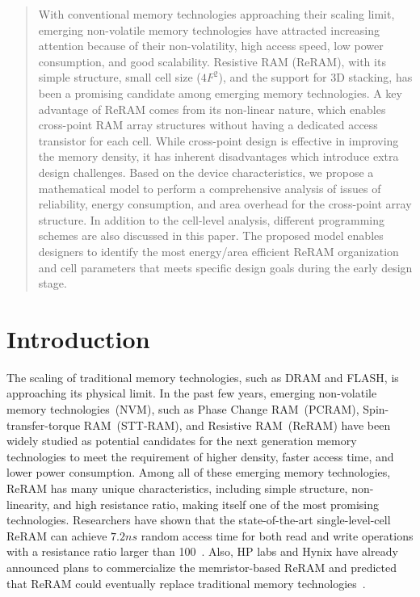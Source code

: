 \begin{abstract}
With conventional memory technologies approaching their scaling limit,
emerging non-volatile memory technologies have attracted increasing%
attention because of their non-volatility, high access speed, low power
consumption, and good scalability. Resistive RAM (ReRAM), with its simple
structure, small cell size ($4F^2$), and the support for 3D stacking, has been
a promising candidate among emerging memory technologies. 
A key advantage of ReRAM
comes from its non-linear nature, which enables  cross-point
RAM array structures without having a dedicated access transistor for each cell. While
cross-point design is effective in improving the memory density, it has
inherent disadvantages which introduce extra design challenges. Based on
the device characteristics, we propose a
mathematical model to perform a comprehensive analysis of issues of
reliability, energy consumption, and area overhead for the cross-point array structure. In addition to the
cell-level analysis, different programming schemes are also discussed in
this paper. The proposed model enables designers to identify the most
energy/area efficient ReRAM organization and cell parameters that meets
specific design goals during the early design stage.
\end{abstract}

\section{Introduction}\label{sec:intro}
The scaling of traditional memory technologies, such as DRAM and FLASH, is
approaching its physical limit. In the past few years, emerging
non-volatile memory technologies~(NVM), such as Phase Change RAM~(PCRAM),
Spin-transfer-torque RAM~(STT-RAM), and Resistive RAM~(ReRAM) have been widely
studied as potential candidates for the next generation memory
technologies to meet the requirement of higher density, faster access time, and
lower power consumption. Among all of these emerging memory technologies,
ReRAM has many unique characteristics, including simple structure,
non-linearity,  and high resistance ratio, making itself one of the most
promising technologies. Researchers have shown that the state-of-the-art
single-level-cell ReRAM can achieve $7.2ns$ random access time for both
read and write operations with a resistance ratio larger than
100~\cite{ReRAM_ISSCC2011_Sheu}. Also, HP labs and Hynix have already
announced plans to commercialize the memristor-based ReRAM and predicted
that ReRAM could eventually replace traditional memory
technologies~\cite{memristor:HpHynix}.

